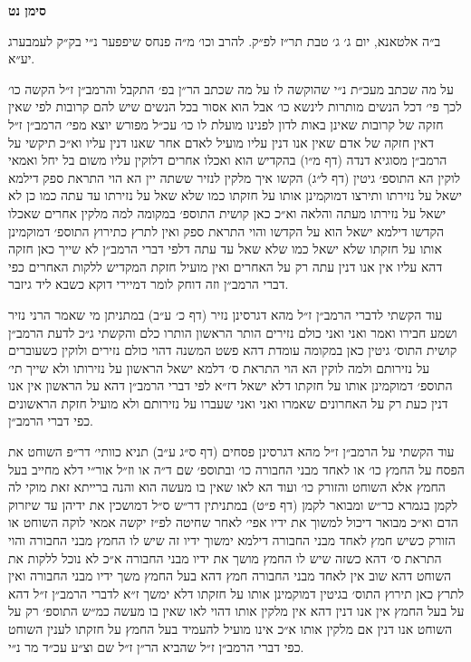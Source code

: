 \documentclass[12pt, openany]{book}
\newcommand{\chapname}{}
\newcommand{\newchap}[1]{
	\addcontentsline{toc}{chapter}{#1}
	\renewcommand{\chapname}{#1}
		\begin{center}
			\textbf{%
\fontsize{16pt}{16pt}\selectfont
				#1}
		\end{center}
}
\begin{document}
\newchap{סימן נט}
\begin{multicols}{2}
ב״ה אלטאנא, יום ג׳ ג׳ טבת תר״ז לפ״ק. להרב וכו׳ מ״ה פנחס שיפפער נ״י בק״ק לעמבערג יע״א.\\\vspace{0pt}

על מה שכתב מעכ״ת נ״י שהוקשה לו על מה שכתב הר״ן בפ׳ התקבל והרמב״ן ז״ל הקשה כו׳ לכך פי׳ דכל הנשים מותרות לינשא כו׳ אבל הוא אסור בכל הנשים שיש להם קרובות לפי שאין חזקה של קרובות שאינן באות לדון לפנינו מועלת לו כו׳ עכ״ל מפורש יוצא מפי׳ הרמב״ן ז״ל דאין חזקה של אדם שאין אנו דנין עליו מועיל לאדם אחר שאנו דנין עליו וא״כ תיקשי על הרמב״ן מסוגיא דנדה (דף מ״ו) בהקדיש הוא ואכלו אחרים דלוקין עליו משום בל יחל ואמאי לוקין הא התוספ׳ גיטין (דף ל״ג) הקשו איך מלקין לנזיר ששתה יין הא הוי התראת ספק דילמא ישאל על נזירתו ותירצו דמוקמינן אותו על חזקתו כמו שלא שאל על נזירתו עד עתה כמו כן לא ישאל על נזירתו מעתה והלאה וא״כ כאן קושית התוספ׳ במקומה למה מלקין אחרים שאכלו הקדשו דילמא ישאל הוא על הקדשו והוי התראת ספק ואין לתרץ כתירוץ התוספ׳ דמוקמינן אותו על חזקתו שלא ישאל כמו שלא שאל עד עתה דלפי דברי הרמב״ן לא שייך כאן חזקה דהא עליו אין אנו דנין עתה רק על האחרים ואין מועיל חזקת המקדיש ללקות האחרים כפי דברי הרמב״ן וזה דוחק לומר דמיירי דוקא כשבא ליד גיזבר.\\\vspace{0pt}

עוד הקשתי לדברי הרמב״ן ז״ל מהא דגרסינן נזיר (דף כ׳ ע״ב) במתניתן מי שאמר הרני נזיר ושמע חבירו ואמר ואני ואני כולם נזירים הותר הראשון הותרו כלם והקשתי ג״כ לדעת הרמב״ן קושית התוס׳ גיטין כאן במקומה עומדת דהא פשט המשנה דהוי כולם נזירים ולוקין כשעוברים על נזירותם ולמה לוקין הא הוי התראת ס׳ דלמא ישאל הראשון על נזירותו ולא שייך תי׳ התוספ׳ דמוקמינן אותו על חזקתו דלא ישאל דז״א לפי דברי הרמב״ן דהא על הראשון אין אנו דנין כעת רק על האחרונים שאמרו ואני ואני שעברו על נזירותם ולא מועיל חזקת הראשונים כפי דברי הרמב״ן.\\\vspace{0pt}

עוד הקשתי על הרמב״ן ז״ל מהא דגרסינן פסחים (דף ס״ג ע״ב) תניא כוותי׳ דר״פ השוחט את הפסח על החמץ כו׳ או לאחד מבני החבורה כו׳ ובתוספ׳ שם ד״ה או וז״ל אור״י דלא מחייב בעל החמץ אלא השוחט והזורק כו׳ ועוד הא לאו שאין בו מעשה הוא והנה ברייתא זאת מוקי לה לקמן בגמרא כר״ש ומבואר לקמן (דף פ״ט) במתניתין דר״ש ס״ל דמושכין את ידיהן עד שיזרוק הדם וא״כ מבואר דיכול למשוך את ידיו אפי׳ לאחר שחיטה לפ״ז יקשה אמאי לוקה השוחט או הזורק כשיש חמץ לאחד מבני החבורה דילמא ימשוך ידיו זה שיש לו החמץ מבני החבורה והוי התראת ס׳ דהא כשזה שיש לו החמץ מושך את ידיו מבני החבורה א״כ לא נוכל ללקות את השוחט דהא שוב אין לאחד מבני החבורה חמץ דהא בעל החמץ משך ידיו מבני החבורה ואין לתרץ כאן תירוץ התוס׳ בגיטין דמוקמינן אותו על חזקתו דלא ימשך ז״א לדברי הרמב״ן ז״ל דהא על בעל החמץ אין אנו דנין דהא אין מלקין אותו דהוי לאו שאין בו מעשה כמ״ש התוספ׳ רק על השוחט אנו דנין אם מלקין אותו א״כ אינו מועיל להעמיד בעל החמץ על חזקתו לענין השוחט כפי דברי הרמב״ן ז״ל שהביא הר״ן ז״ל שם וצ״ע עכ״ד מר נ״י.\\\vspace{0pt}


\end{multicols}
\end{document}

